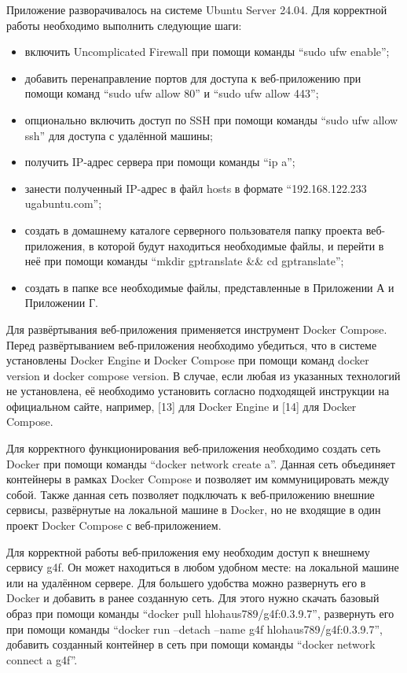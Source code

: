 \clearpage
{}

Приложение разворачивалось на системе Ubuntu Server 24.04. Для корректной работы необходимо выполнить следующие шаги:

\begin{itemize}
    \item включить Uncomplicated Firewall при помощи команды “sudo ufw enable”;
    \item добавить перенаправление портов для доступа к веб-приложению при помощи команд “sudo ufw allow 80” и “sudo ufw allow 443”;
    \item опционально включить доступ по SSH при помощи команды “sudo ufw allow ssh” для доступа с удалённой машины;
    \item получить IP-адрес сервера при помощи команды “ip a”;
    \item занести полученный IP-адрес в файл hosts в формате “192.168.122.233 ugabuntu.com”;
    \item создать в домашнему каталоге серверного пользователя папку проекта веб-приложения, в которой будут находиться необходимые файлы, и перейти в неё при помощи команды “mkdir gptranslate \&\& cd gptranslate”;
    \item создать в папке все необходимые файлы, представленные в Приложении А и Приложении Г.
\end{itemize}

Для развёртывания веб-приложения применяется инструмент Docker Compose. Перед развёртыванием веб-приложения необходимо убедиться, что в системе установлены Docker Engine и Docker Compose при помощи команд docker version и docker compose version. В случае, если любая из указанных технологий не установлена, её необходимо установить согласно подходящей инструкции на официальном сайте, например, [13] для Docker Engine и [14] для Docker Compose.

Для корректного функционирования веб-приложения необходимо создать сеть Docker при помощи команды “docker network create a”. Данная сеть объединяет контейнеры в рамках Docker Compose и позволяет им коммуницировать между собой. Также данная сеть позволяет подключать к веб-приложению внешние сервисы, развёрнутые на локальной машине  в Docker, но не входящие в один проект Docker Compose с веб-приложением.

Для корректной работы веб-приложения ему необходим доступ к внешнему сервису g4f. Он может находиться в любом удобном месте: на локальной машине или на удалённом сервере. Для большего удобства можно развернуть его в Docker и добавить в ранее созданную сеть. Для этого нужно скачать базовый образ при помощи команды “docker pull hlohaus789/g4f:0.3.9.7”, развернуть его при помощи команды “docker run --detach --name g4f hlohaus789/g4f:0.3.9.7”, добавить созданный контейнер в сеть при помощи команды “docker network connect a g4f”.

